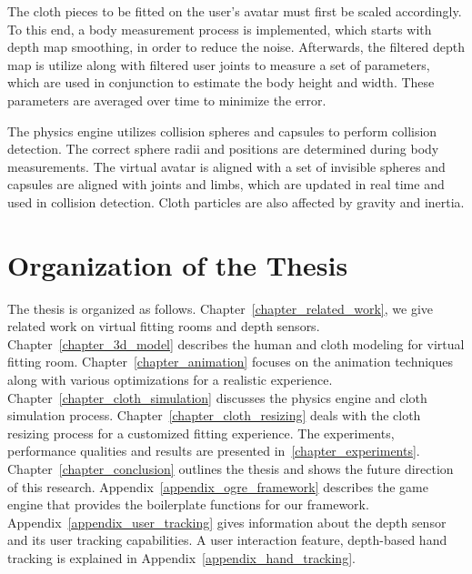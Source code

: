 The cloth pieces to be fitted on the user's avatar must first be scaled accordingly. To this end, a body measurement process is implemented, which starts with depth map smoothing, in order to reduce the noise. Afterwards, the filtered depth map is utilize along with filtered user joints to measure a set of parameters, which are used in conjunction to estimate the body height and width. These parameters are averaged over time to minimize the error.

The physics engine utilizes collision spheres and capsules to perform collision detection. The correct sphere radii and positions are determined during body measurements. The virtual avatar is aligned with a set of invisible spheres and capsules are aligned with joints and limbs, which are updated in real time and used in collision detection. Cloth particles are also affected by gravity and inertia.


\section{Organization of the Thesis}

The thesis is organized as follows. Chapter~\ref{chapter_related_work}, we give related work on virtual fitting rooms and 
depth sensors. Chapter~\ref{chapter_3d_model} describes the human and cloth modeling for virtual fitting room. Chapter~\ref{chapter_animation} focuses on the animation techniques along with various optimizations for a realistic experience. Chapter~\ref{chapter_cloth_simulation} discusses the physics engine and cloth simulation process. Chapter~\ref{chapter_cloth_resizing} deals with the cloth resizing process for a customized fitting experience. The experiments, performance qualities and results are presented in~\ref{chapter_experiments}. Chapter~\ref{chapter_conclusion} outlines the thesis and shows the future direction of this research. Appendix~\ref{appendix_ogre_framework} describes the game engine that provides the boilerplate functions for our framework. Appendix~\ref{appendix_user_tracking} gives information about the depth sensor and its user tracking capabilities. A user interaction feature, depth-based hand tracking is explained in Appendix~\ref{appendix_hand_tracking}.
